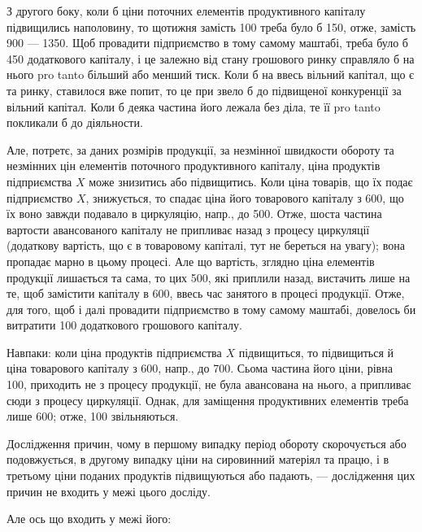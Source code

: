 З другого боку, коли б ціни поточних елементів продуктивного капіталу
підвищились наполовину, то щотижня замість 100 треба
було б 150, отже, замість 900 — 1350. Щоб
провадити підприємство в тому самому маштабі, треба було б 450 додаткового капіталу, і це залежно від стану грошового ринку
справляло б на нього pro tanto більший або менший тиск. Коли б на
ввесь вільний капітал, що є та ринку, ставилося вже попит, то це при
звело б до підвищеної конкуренції за вільний капітал. Коли б деяка частина
його лежала без діла, те її pro tanto покликали б до діяльности.

Але, потретє, за даних розмірів продукції, за незмінної швидкости
обороту та незмінних цін елементів поточного продуктивного капіталу,
ціна продуктів підприємства $X$ може знизитись або підвищитись. Коли
ціна товарів, що їх подає підприємство $X$, знижується, то спадає ціна
його товарового капіталу з 600, що їх воно завжди подавало
в циркуляцію, напр., до 500. Отже, шоста частина вартости авансованого
капіталу не припливає назад з процесу циркуляції (додаткову вартість,
що є в товаровому капіталі, тут не береться на увагу); вона пропадає
марно в цьому процесі. Але що вартість, зглядно ціна елементів продукції
лишається та сама, то цих 500, які приплили назад, вистачить
лише на те, щоб замістити  капіталу в 600, ввесь час
занятого в процесі продукції. Отже, для того, щоб і далі провадити підприємство
в тому самому маштабі, довелось би витратити 100
додаткового грошового капіталу.

Навпаки: коли ціна продуктів підприємства $X$ підвищиться, то підвищиться
й ціна товарового капіталу з 600, напр., до 700. Сьома частина його ціни, рівна 100, приходить не з
процесу продукції, не була авансована на нього, а припливає сюди з
процесу циркуляції. Однак, для заміщення продуктивних елементів треба
лише 600; отже, 100 звільняються.

Дослідження причин, чому в першому випадку період обороту
скорочується або подовжується, в другому випадку ціни на сировинний
матеріял та працю, і в третьому ціни поданих продуктів підвищуються
або падають, — дослідження цих причин не входить у межі цього досліду.

Але ось що входить у межі його:

